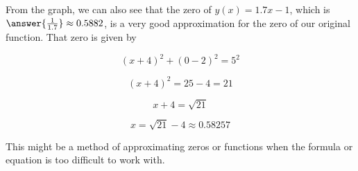 \documentclass{ximera}
\begin{document}
From the graph, we can also see that the zero of $y(x) = 1.7x - 1$, which is $\answer{\frac{1}{1.7}} \approx 0.5882$, is a very good approximation for the zero of our original function.  That zero is given by



\[
(x+4)^2 + (0-2)^2 = 5^2
\]


\[
(x+4)^2  = 25 - 4 = 21
\]



\[
x+4  = \sqrt{21}
\]

\[
x = \sqrt{21} - 4 \approx 0.58257
\]





This might be a method of approximating zeros or functions when the formula or equation is too difficult to work with.
\end{document}
